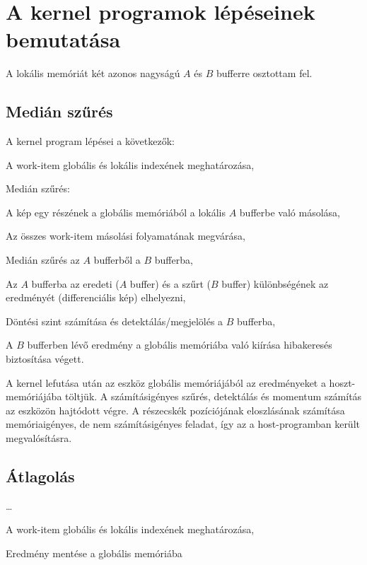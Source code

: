 \chapter{A kernel programok lépéseinek bemutatása}
A lokális memóriát két azonos nagyságú $A$ és $B$ bufferre osztottam fel.

\section{Medián szűrés}
	\noindent A kernel program lépései a következők:
	\begin{enumerate*}
		\item A work-item globális és lokális indexének meghatározása,
		\item Medián szűrés:
		\item A kép egy részének a globális memóriából a lokális $A$ bufferbe való másolása,
		\item Az összes work-item másolási folyamatának megvárása,
		\item Medián szűrés az $A$ bufferből a $B$ bufferba,
		\item Az $A$ bufferba az eredeti ($A$ buffer) és a szűrt ($B$ buffer) különbségének az eredményét
		(differenciális kép) elhelyezni,
		\item Döntési szint számítása és detektálás/megjelölés a $B$ bufferba,
		\item A $B$ bufferben lévő eredmény a globális memóriába való kiírása hibakeresés biztosítása végett.
	\end{enumerate*}
	
	A kernel lefutása után az eszköz globális memóriájából az eredményeket a hoszt-memóriájába töltjük.
	A számításigényes szűrés, detektálás és momentum számítás az eszközön hajtódott végre. A részecskék
	pozíciójának eloszlásának számítása memóriaigényes, de nem számításigényes feladat, így az a
	host-programban került megvalósításra.

\section{Átlagolás}
\dots
	\begin{enumerate*}
		\item A work-item globális és lokális indexének meghatározása,
		\item Eredmény mentése a globális memóriába
	\end{enumerate*}

